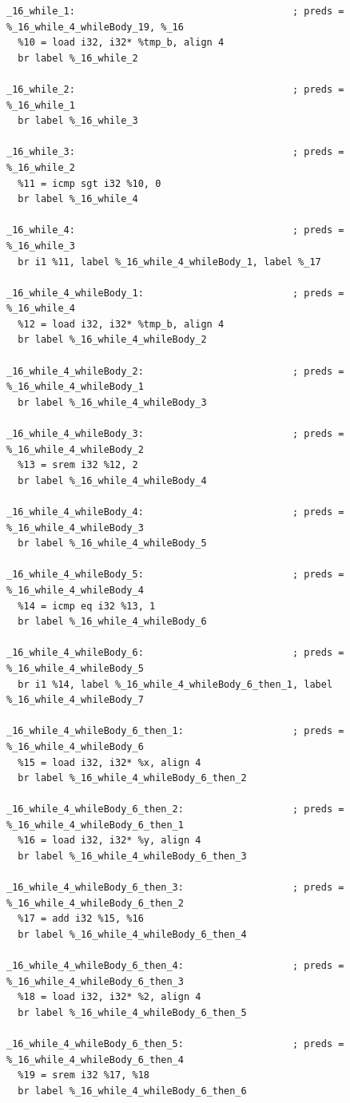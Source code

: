 \documentclass[12pt,a4paper]{article}
\begin{document}
\begin{verbatim}
_16_while_1:                                      ; preds = %_16_while_4_whileBody_19, %_16
  %10 = load i32, i32* %tmp_b, align 4
  br label %_16_while_2

_16_while_2:                                      ; preds = %_16_while_1
  br label %_16_while_3

_16_while_3:                                      ; preds = %_16_while_2
  %11 = icmp sgt i32 %10, 0
  br label %_16_while_4

_16_while_4:                                      ; preds = %_16_while_3
  br i1 %11, label %_16_while_4_whileBody_1, label %_17

_16_while_4_whileBody_1:                          ; preds = %_16_while_4
  %12 = load i32, i32* %tmp_b, align 4
  br label %_16_while_4_whileBody_2

_16_while_4_whileBody_2:                          ; preds = %_16_while_4_whileBody_1
  br label %_16_while_4_whileBody_3

_16_while_4_whileBody_3:                          ; preds = %_16_while_4_whileBody_2
  %13 = srem i32 %12, 2
  br label %_16_while_4_whileBody_4

_16_while_4_whileBody_4:                          ; preds = %_16_while_4_whileBody_3
  br label %_16_while_4_whileBody_5

_16_while_4_whileBody_5:                          ; preds = %_16_while_4_whileBody_4
  %14 = icmp eq i32 %13, 1
  br label %_16_while_4_whileBody_6

_16_while_4_whileBody_6:                          ; preds = %_16_while_4_whileBody_5
  br i1 %14, label %_16_while_4_whileBody_6_then_1, label %_16_while_4_whileBody_7

_16_while_4_whileBody_6_then_1:                   ; preds = %_16_while_4_whileBody_6
  %15 = load i32, i32* %x, align 4
  br label %_16_while_4_whileBody_6_then_2

_16_while_4_whileBody_6_then_2:                   ; preds = %_16_while_4_whileBody_6_then_1
  %16 = load i32, i32* %y, align 4
  br label %_16_while_4_whileBody_6_then_3

_16_while_4_whileBody_6_then_3:                   ; preds = %_16_while_4_whileBody_6_then_2
  %17 = add i32 %15, %16
  br label %_16_while_4_whileBody_6_then_4

_16_while_4_whileBody_6_then_4:                   ; preds = %_16_while_4_whileBody_6_then_3
  %18 = load i32, i32* %2, align 4
  br label %_16_while_4_whileBody_6_then_5

_16_while_4_whileBody_6_then_5:                   ; preds = %_16_while_4_whileBody_6_then_4
  %19 = srem i32 %17, %18
  br label %_16_while_4_whileBody_6_then_6


\end{verbatim}
\end{document}
